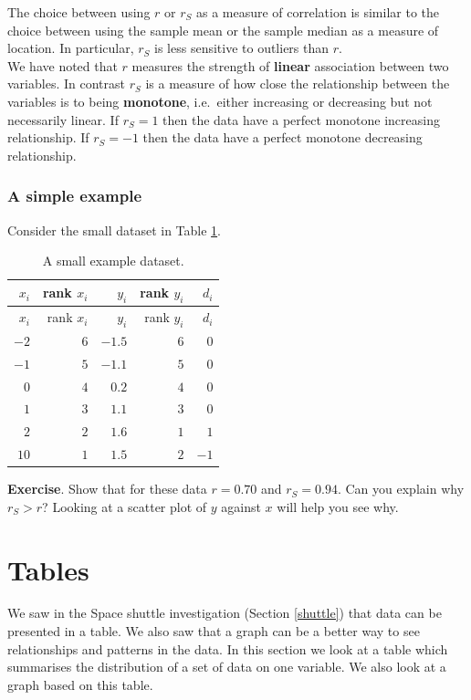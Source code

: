 \documentclass[
  british,
]{book}
\begin{document}
The choice between using \(r\) or \(r_S\) as a measure of correlation is similar to the choice between using the sample mean or the sample median as a measure of location. In particular, \(r_S\) is less sensitive to outliers than \(r\).\\
We have noted that \(r\) measures the strength of \textbf{linear} association between two variables. In contrast \(r_S\) is a measure of how close the relationship between the variables is to being \textbf{monotone}, i.e.~either increasing or decreasing but not necessarily linear. If \(r_S=1\) then the data have a perfect monotone increasing relationship. If \(r_S=-1\) then the data have a perfect monotone decreasing relationship.

\hypertarget{a-simple-example}{%
\subsubsection*{A simple example}\label{a-simple-example}}

Consider the small dataset in Table \ref{tab:smalldata}.

\begin{longtable}[]{@{}rrrrr@{}}
\caption{\label{tab:smalldata} A small example dataset.}\tabularnewline
\toprule
\(x_i\) & rank \(x_i\) & \(y_i\) & rank \(y_i\) & \(d_i\)\tabularnewline
\midrule
\endfirsthead
\toprule
\(x_i\) & rank \(x_i\) & \(y_i\) & rank \(y_i\) & \(d_i\)\tabularnewline
\midrule
\endhead
\(-2\) & \(6\) & \(-1.5\) & \(6\) & \(0\)\tabularnewline
\(-1\) & \(5\) & \(-1.1\) & \(5\) & \(0\)\tabularnewline
\(0\) & \(4\) & \(0.2\) & \(4\) & \(0\)\tabularnewline
\(1\) & \(3\) & \(1.1\) & \(3\) & \(0\)\tabularnewline
\(2\) & \(2\) & \(1.6\) & \(1\) & \(1\)\tabularnewline
\(10\) & \(1\) & \(1.5\) & \(2\) & \(-1\)\tabularnewline
\bottomrule
\end{longtable}

\textbf{Exercise}. Show that for these data \(r=0.70\) and \(r_S=0.94\). Can you explain why \(r_S>r\)? Looking at a scatter plot of \(y\) against \(x\) will help you see why.

\hypertarget{tables}{%
\section{Tables}\label{tables}}

We saw in the Space shuttle investigation (Section \ref{shuttle}) that data can be presented in a table. We also saw that a graph can be a better way to see relationships and patterns in the data. In this section we look at a table which summarises the distribution of a set of data on one variable. We also look at a graph based on this table.
\end{document}
